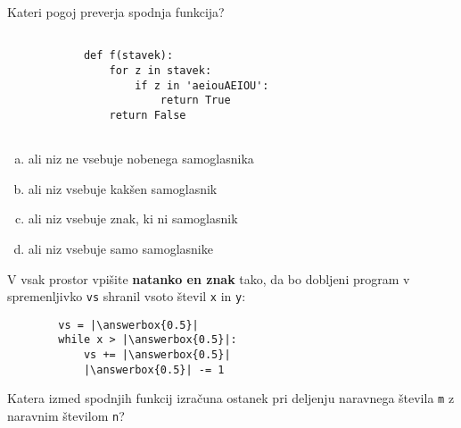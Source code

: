 \documentclass[arhiv, 10pt]{../izpit}
\newcommand{\inlinepy}[1]{\texttt{#1}}
\newcommand{\answerbox}[1]{\framebox{\vphantom{\large M}\hspace{#1cm}}}
\begin{document}
        \naloga*

        \begin{multicols}{2}
        \noindent
        Kateri pogoj preverja spodnja funkcija?
        \begin{verbatim}
        
            def f(stavek):
                for z in stavek:
                    if z in 'aeiouAEIOU':
                        return True
                return False
            
        \end{verbatim}

        \begin{enumerate}[(a)]
\item ali niz ne vsebuje nobenega samoglasnika
\item ali niz vsebuje kakšen samoglasnik
\item ali niz vsebuje znak, ki ni samoglasnik
\item ali niz vsebuje samo samoglasnike
\end{enumerate}

        \end{multicols}
    
        \naloga*
        \begin{multicols}{2}
        \noindent
        V vsak prostor vpišite \textbf{natanko en znak} tako, da bo dobljeni program v spremenljivko \inlinepy{vs} shranil vsoto števil \inlinepy{x} in \inlinepy{y}:
        
        \columnbreak
        \begin{verbatim}
        vs = |\answerbox{0.5}|
        while x > |\answerbox{0.5}|:
            vs += |\answerbox{0.5}|
            |\answerbox{0.5}| -= 1
        \end{verbatim}
        \end{multicols}
    
        \clearpage
        \naloga
        
        Katera izmed spodnjih funkcij izračuna ostanek pri deljenju naravnega števila \inlinepy{m} z naravnim številom \inlinepy{n}?
    
\end{document}
